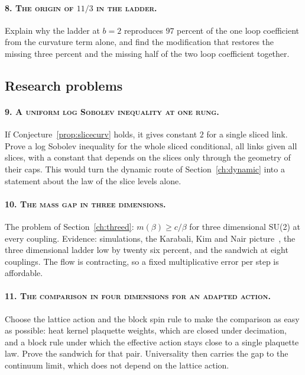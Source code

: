 \paragraph{\normalfont\scshape 8. The origin of $11/3$ in the ladder.} Explain why the ladder at $b=2$ reproduces $97$ percent of the one loop coefficient from the curvature term alone, and find the modification that restores the missing three percent and the missing half of the two loop coefficient together.

\subsection{Research problems}

\paragraph{\normalfont\scshape 9. A uniform log Sobolev inequality at one rung.} If Conjecture~\ref{prop:slicecurv} holds, it gives constant $2$ for a single sliced link. Prove a log Sobolev inequality for the whole sliced conditional, all links given all slices, with a constant that depends on the slices only through the geometry of their caps. This would turn the dynamic route of Section~\ref{ch:dynamic} into a statement about the law of the slice levels alone.

\paragraph{\normalfont\scshape 10. The mass gap in three dimensions.} The problem of Section~\ref{ch:threed}: $m(\beta)\ge c/\beta$ for three dimensional SU(2) at every coupling. Evidence: simulations, the Karabali, Kim and Nair picture~\cite{KKN}, the three dimensional ladder low by twenty six percent, and the sandwich at eight couplings. The flow is contracting, so a fixed multiplicative error per step is affordable.

\paragraph{\normalfont\scshape 11. The comparison in four dimensions for an adapted action.} Choose the lattice action and the block spin rule to make the comparison as easy as possible: heat kernel plaquette weights, which are closed under decimation, and a block rule under which the effective action stays close to a single plaquette law. Prove the sandwich for that pair. Universality then carries the gap to the continuum limit, which does not depend on the lattice action.

